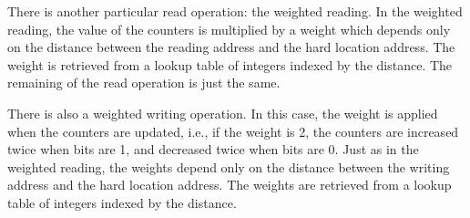 There is another particular read operation: the weighted reading. In the weighted reading, the value of the counters is multiplied by a weight which depends only on the distance between the reading address and the hard location address. The weight is retrieved from a lookup table of integers indexed by the distance. The remaining of the read operation is just the same.

There is also a weighted writing operation. In this case, the weight is applied when the counters are updated, i.e., if the weight is 2, the counters are increased twice when bits are 1, and decreased twice when bits are 0. Just as in the weighted reading, the weights depend only on the distance between the writing address and the hard location address. The weights are retrieved from a lookup table of integers indexed by the distance.
